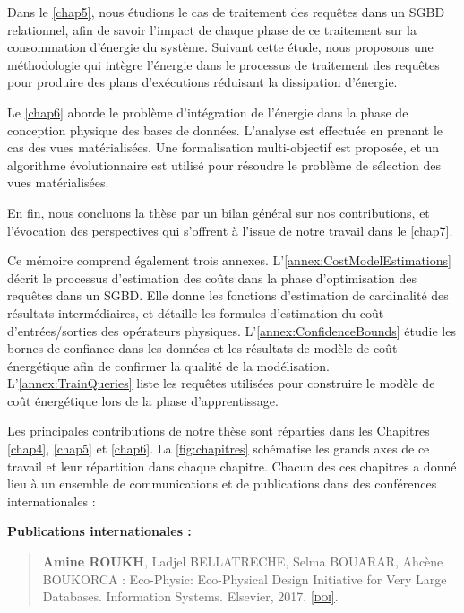 Dans le \ref{chap5}, nous étudions le cas de traitement des requêtes dans un SGBD relationnel, afin de savoir l'impact de chaque phase de ce traitement sur la consommation d'énergie du système. Suivant cette étude, nous proposons une méthodologie qui intègre l'énergie dans le processus de traitement des requêtes pour produire des plans d'exécutions réduisant la dissipation d'énergie.

Le \ref{chap6} aborde le problème d'intégration de l'énergie dans la phase de conception physique des bases de données. L'analyse est effectuée en prenant le cas des vues matérialisées. Une formalisation multi-objectif est proposée, et un algorithme évolutionnaire est utilisé pour résoudre le problème de sélection des vues matérialisées.

En fin, nous concluons la thèse par un bilan général sur nos contributions, et l'évocation des perspectives qui s'offrent à l'issue de notre travail dans le \ref{chap7}.

Ce mémoire comprend également trois annexes. L'\ref{annex:CostModelEstimations} décrit le processus d'estimation des coûts dans la phase d'optimisation des requêtes dans un SGBD. Elle donne les fonctions d'estimation de cardinalité des résultats intermédiaires, et détaille les formules d'estimation du coût d'entrées/sorties des opérateurs physiques. L'\ref{annex:ConfidenceBounds} étudie les bornes de confiance dans les données et les résultats de modèle de coût énergétique afin de confirmer la qualité de la modélisation. L'\ref{annex:TrainQueries} liste les requêtes utilisées pour construire le modèle de coût énergétique lors de la phase d'apprentissage.

Les principales contributions de notre thèse sont réparties dans les Chapitres \ref{chap4}, \ref{chap5} et \ref{chap6}. La \ref{fig:chapitres} schématise les grands axes de ce travail et leur répartition dans chaque chapitre.
Chacun des ces chapitres a donné lieu à un ensemble de communications et de publications dans des conférences internationales :

\textbf{Publications internationales :}

\begin{quote}
	\cite{Roukh17} 
	\textbf{Amine ROUKH}, Ladjel BELLATRECHE, Selma BOUARAR, Ahcène BOUKORCA : Eco-Physic: Eco-Physical Design Initiative for Very Large Databases. Information Systems. Elsevier, 2017. \href{http://dx.doi.org/10.1016/j.is.2017.01.003}{\textsc{[doi]}}.
\end{quote}

